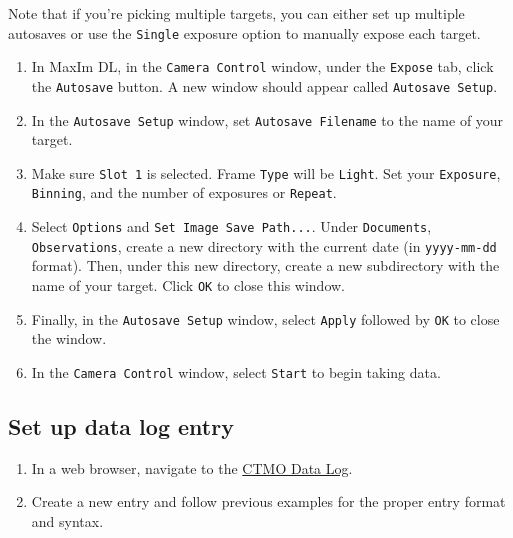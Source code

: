 \documentclass{article}
\begin{document}
		Note that if you're picking multiple targets, you can either set up multiple autosaves or use the \texttt{Single} exposure option to manually expose each target.
		
		\begin{enumerate}
			
			\item In MaxIm DL, in the \texttt{Camera Control} window, under the \texttt{Expose} tab, click the \texttt{Autosave} button. A new window should appear called \texttt{Autosave Setup}.
			
			\item In the \texttt{Autosave Setup} window, set \texttt{Autosave Filename} to the name of your target.
			
			\item Make sure \texttt{Slot 1} is selected. Frame \texttt{Type} will be \texttt{Light}. Set your \texttt{Exposure}, \texttt{Binning}, and the number of exposures or \texttt{Repeat}.
			
			\item Select \texttt{Options} and \texttt{Set Image Save Path...}. Under \texttt{Documents}, \texttt{Observations}, create a new directory with the current date (in \texttt{yyyy-mm-dd} format). Then, under this new directory, create a new subdirectory with the name of your target. Click \texttt{OK} to close this window.
			
			\item Finally, in the \texttt{Autosave Setup} window, select \texttt{Apply} followed by \texttt{OK} to close the window.
			
			\item In the \texttt{Camera Control} window, select \texttt{Start} to begin taking data.
			
		\end{enumerate}
	
	\subsection{Set up data log entry}
	
		\begin{enumerate}
			
			\item In a web browser, navigate to the \href{https://docs.google.com/spreadsheets/d/1-flrFYcHwpuXavXAMwkF41ibTWqWWC0Sgsv5X402HyY/edit?usp=sharing}{CTMO Data Log}.
			
			\item Create a new entry and follow previous examples for the proper entry format and syntax.
			
		\end{enumerate}
		
\end{document}
